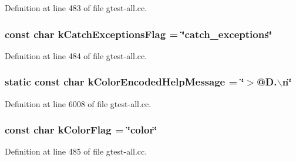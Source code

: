 \-Definition at line 483 of file gtest-\/all.\-cc.

\hypertarget{namespacetesting_1_1internal_a1a9e7362cafa5838b6cae9fb1a861ada}{
\subsubsection[{k\-Catch\-Exceptions\-Flag}]{\setlength{\rightskip}{0pt plus 5cm}const char {\bf k\-Catch\-Exceptions\-Flag} = \char`\"{}catch\-\_\-exceptions\char`\"{}}}\label{d0/da7/namespacetesting_1_1internal_a1a9e7362cafa5838b6cae9fb1a861ada}


\-Definition at line 484 of file gtest-\/all.\-cc.

\hypertarget{namespacetesting_1_1internal_a5d9d2135a9f157ab41418c0e0c3f0b4f}{
\subsubsection[{k\-Color\-Encoded\-Help\-Message}]{\setlength{\rightskip}{0pt plus 5cm}static const char {\bf k\-Color\-Encoded\-Help\-Message} = \char`\"{}$>$@\-D.$\backslash$n\char`\"{}}}\label{d0/da7/namespacetesting_1_1internal_a5d9d2135a9f157ab41418c0e0c3f0b4f}


\-Definition at line 6008 of file gtest-\/all.\-cc.

\hypertarget{namespacetesting_1_1internal_a0794d62b77bae59a9082ba4b7ea1fc90}{
\subsubsection[{k\-Color\-Flag}]{\setlength{\rightskip}{0pt plus 5cm}const char {\bf k\-Color\-Flag} = \char`\"{}color\char`\"{}}}\label{d0/da7/namespacetesting_1_1internal_a0794d62b77bae59a9082ba4b7ea1fc90}


\-Definition at line 485 of file gtest-\/all.\-cc.


